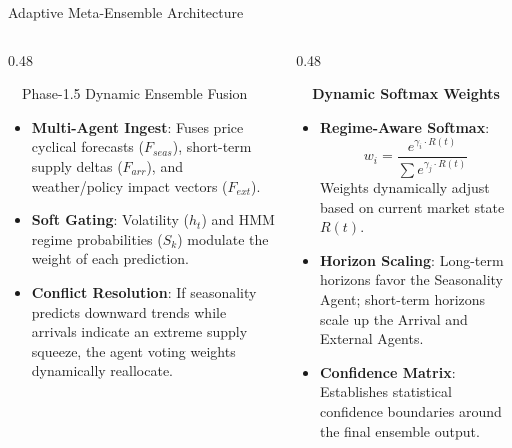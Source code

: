 \documentclass{beamer}
\begin{document}
\begin{frame}{Adaptive Meta-Ensemble Architecture}
\vspace{-0.25cm}

\begin{columns}[T]
    \begin{column}{0.48\textwidth}
        \begin{successcard}[height=5.0cm]{~~Phase-1.5 Dynamic Ensemble Fusion}
            \fontsize{6.8pt}{8.2pt}\selectfont
            \begin{itemize}\setlength\itemsep{3pt}\setlength\parskip{0pt}
                \item \textbf{Multi-Agent Ingest}: Fuses price cyclical forecasts ($F_{seas}$), short-term supply deltas ($F_{arr}$), and weather/policy impact vectors ($F_{ext}$).
                \item \textbf{Soft Gating}: Volatility ($h_t$) and HMM regime probabilities ($S_k$) modulate the weight of each prediction.
                \item \textbf{Conflict Resolution}: If seasonality predicts downward trends while arrivals indicate an extreme supply squeeze, the agent voting weights dynamically reallocate.
            \end{itemize}
        \end{successcard}
    \end{column}
    
    \begin{column}{0.48\textwidth}
        \begin{smallcard}[0.98\textwidth, top=3pt, bottom=3pt, left=4pt, right=4pt, boxsep=0.5pt]
            \centering \textbf{\textcolor{primaryDark}{\small {}~~Dynamic Softmax Weights}}
            \vspace{0.05cm}
            \fontsize{6.8pt}{8.2pt}\selectfont
            \begin{itemize}\setlength\itemsep{3.5pt}\setlength\parskip{0pt}
                \item \textbf{Regime-Aware Softmax}:
                \[ w_i = \frac{e^{\gamma_i \cdot R(t)}}{\sum e^{\gamma_j \cdot R(t)}} \]
                Weights dynamically adjust based on current market state $R(t)$.
                \item \textbf{Horizon Scaling}: Long-term horizons favor the Seasonality Agent; short-term horizons scale up the Arrival and External Agents.
                \item \textbf{Confidence Matrix}: Establishes statistical confidence boundaries around the final ensemble output.
            \end{itemize}
        \end{smallcard}
    \end{column}
\end{columns}


\end{frame}
\end{document}
